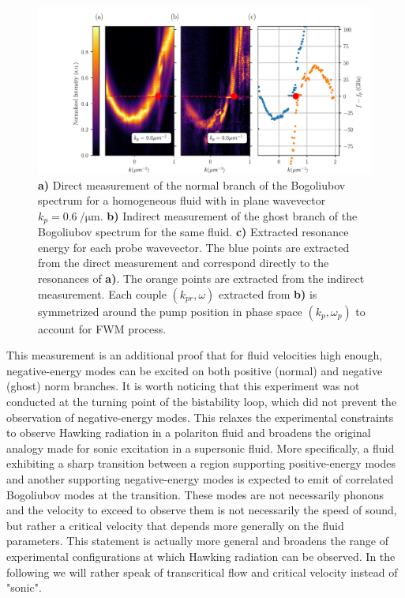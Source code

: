 \begin{figure}[t!]
    \centering
    \includegraphics[width=1\textwidth]{chap_custom_st/fig/supersonic_homogenous.pdf}
    \caption{\textbf{a)} Direct measurement of the normal branch of the Bogoliubov spectrum for a homogeneous fluid with in plane wavevector $k_p=\SI{0.6}{\per \micro \meter}.$ \textbf{\textbf{b)}} Indirect measurement of the ghost branch of the Bogoliubov spectrum for the same fluid.
    \textbf{c)} Extracted resonance energy for each probe wavevector. The blue points are extracted from the direct measurement and correspond directly to the resonances of \textbf{a)}. The orange points are extracted from the indirect measurement. Each couple $(k_{pr}, \omega)$ extracted from \textbf{b)} is symmetrized around the pump position in phase space $(k_p, \omega_p)$ to account for FWM process.}
    \label{fig:homogeneous_fluid_bogo_ghost}
\end{figure}

This measurement is an additional proof that for fluid velocities high enough, negative-energy modes can be excited on both positive (normal) and negative (ghost) norm branches.
It is worth noticing that this experiment was not conducted at the turning point of the bistability loop, which did not prevent the observation of negative-energy modes. This relaxes 
the experimental constraints to observe Hawking radiation in a polariton fluid and broadens the original analogy made for sonic excitation in a supersonic fluid. More specifically,
a fluid exhibiting a sharp transition between a region supporting positive-energy modes and another supporting negative-energy modes is expected to emit of correlated Bogoliubov modes at the transition.
These modes are not necessarily phonons and the velocity to exceed to observe them is not necessarily the speed of sound, but rather a critical velocity that depends more generally on the fluid parameters.
This statement is actually more general and broadens the range of experimental configurations at which Hawking radiation can be observed. In the following 
we will rather speak of transcritical flow and critical velocity instead of "sonic".






